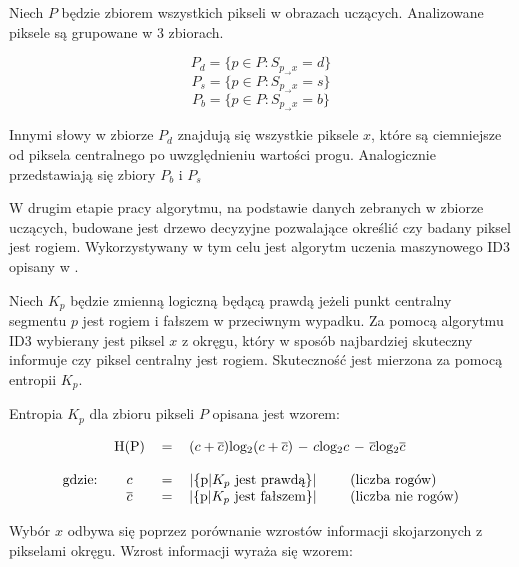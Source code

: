 Niech $P$ będzie zbiorem wszystkich pikseli w obrazach uczących. Analizowane piksele są grupowane w 3 zbiorach.


\begin{equation}
P_d = \lbrace p \in P : S_{p_\rightarrow x}=d\rbrace
\end{equation}
\begin{equation}
P_s = \lbrace p \in P : S_{p_\rightarrow x}=s\rbrace
\end{equation}
\begin{equation}
P_b = \lbrace p \in P : S_{p_\rightarrow x}=b\rbrace
\end{equation}

Innymi słowy w zbiorze $P_d$ znajdują się wszystkie piksele $x$, które są ciemniejsze od piksela centralnego po uwzględnieniu wartości progu. Analogicznie przedstawiają się zbiory $P_b$ i $P_s$


W drugim etapie pracy algorytmu, na podstawie danych zebranych w zbiorze uczących, budowane jest drzewo decyzyjne pozwalające określić czy badany piksel jest rogiem. Wykorzystywany w tym celu jest algorytm uczenia maszynowego ID3 opisany w \cite{ID3}.

Niech $K_p$ będzie zmienną logiczną będącą prawdą jeżeli punkt centralny segmentu $p$ jest rogiem i fałszem w przeciwnym wypadku. Za pomocą algorytmu ID3 wybierany jest piksel $x$ z okręgu, który w sposób najbardziej skuteczny informuje czy piksel centralny jest rogiem. Skuteczność jest mierzona za pomocą entropii $K_p$.

Entropia $K_p$ dla zbioru pikseli $P$ opisana jest wzorem:

\begin{equation}
\begin{tabular}{cccccl}
         & H(P)& = & \multicolumn{3}{l}{($c+\overline{c}$)log$_2$($c+\overline{c}$) $-$ $c$log$_2$$c$ $-$ $\overline{c}$log$_2$$\overline{c}$} \\
&&&&&\\
gdzie: & $c$            & = &  |\{p|$K_p$ jest prawdą\}|& &(liczba rogów) \\
$      $ & $\overline{c}$ & = &  |\{p|$K_p$ jest fałszem\}| & &(liczba nie rogów)  \\
\end{tabular}
\end{equation}

Wybór $x$ odbywa się poprzez porównanie wzrostów informacji skojarzonych z pikselami okręgu. Wzrost informacji wyraża się wzorem:

